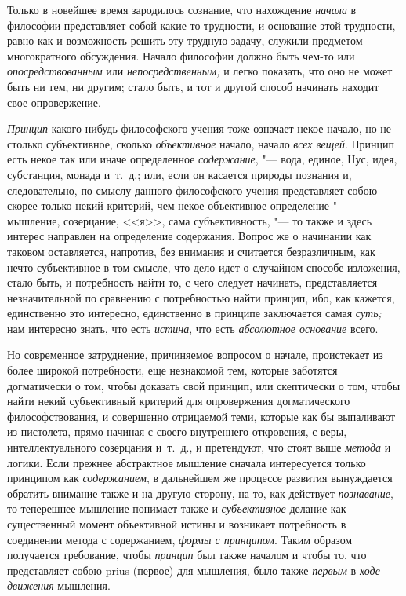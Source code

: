 Только в новейшее время зародилось сознание, что
нахождение {\em начала} в философии представляет собой
какие-то трудности, и основание этой трудности, равно как и возможность
решить эту трудную задачу, служили предметом многократного обсуждения.
Начало философии должно быть чем-то или {\em опосредствованным} или
{\em непосредственным;} и легко показать, что оно не
может быть ни тем, ни другим; стало быть, и тот и другой способ начинать
находит свое опровержение.

{\em Принцип} какого-нибудь философского учения тоже
означает некое начало, но не столько субъективное, сколько
{\em объективное} начало, начало
{\em всех вещей}. Принцип есть некое так или иначе
определенное {\em содержание}, "--- вода, единое, Нус,
идея, субстанция, монада
и~т.~д.; или, если он касается природы познания и, следовательно, по смыслу
данного философского учения представляет собою скорее только некий
критерий, чем некое объективное определение "--- мышление, созерцание, <<я>>,
сама субъективность, "--- то также и здесь интерес направлен на определение
содержания. Вопрос же о начинании как таковом оставляется, напротив, без
внимания и считается безразличным, как нечто субъективное в том смысле, что
дело идет о случайном способе изложения, стало быть, и потребность найти
то, с чего следует начинать, представляется незначительной по сравнению с
потребностью найти принцип, ибо, как кажется, единственно это интересно,
единственно в принципе заключается самая {\em суть;}
нам интересно знать, что есть {\em истина}, что есть
{\em абсолютное основание} всего.

Но современное затруднение, причиняемое вопросом о начале, проистекает из
более широкой потребности, еще незнакомой тем, которые заботятся
догматически о том, чтобы доказать свой принцип, или скептически о том,
чтобы найти некий субъективный критерий для опровержения догматического
философствования, и совершенно отрицаемой теми, которые как бы выпаливают
из пистолета, прямо начиная с своего внутреннего откровения, с веры,
интеллектуального созерцания и~т.~д., и претендуют, что стоят выше
{\em метода} и логики. Если прежнее абстрактное
мышление сначала интересуется только принципом как
{\em содержанием}, в дальнейшем же процессе развития
вынуждается обратить внимание также и на другую сторону, на то, как
действует {\em познавание}, то теперешнее мышление
понимает также и {\em субъективное} делание как
существенный момент объективной истины и возникает потребность в соединении
метода с содержанием, {\em формы с принципом}. Таким
образом получается требование, чтобы {\em принцип} был
также началом и чтобы то, что представляет собою prius (первое) для
мышления, было также {\em первым} в {\em ходе движения} мышления.

